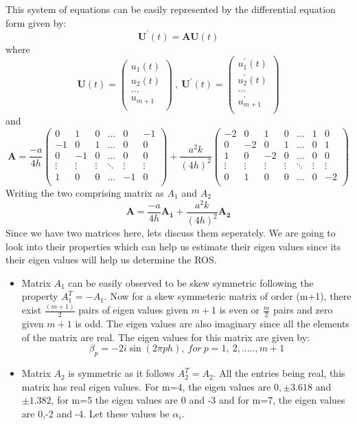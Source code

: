 \documentclass[a4paper,12pt]{report}
\begin{document}
This system of equations can be easily represented by the differential equation form given by:
$$\mathbf{U^{\prime}}(t) = \mathbf{AU}(t)$$ 
where 
\[ 
\mathbf{U}(t) = \begin{pmatrix}
u_{1}(t) \\ u_{2}(t) \\ \ldots \\ u_{m+1} \\
\end{pmatrix}
\ , \
\mathbf{U^{\prime}}(t) = \begin{pmatrix}
u^{\prime}_{1}(t) \\ u^{\prime}_{2}(t) \\ \ldots \\ u^{\prime}_{m+1} \\
\end{pmatrix}
\]
and
\[
\mathbf{A} = 
\frac{-a}{4h}
\begin{pmatrix}
0 & 1 & 0 & \ldots & 0 & -1 \\
-1& 0 & 1 & \ldots & 0 &  0 \\
0 & -1& 0 & \ldots & 0 &  0 \\
\vdots & \vdots & \vdots & \ddots & \vdots & \vdots \\ 
1 & 0 & 0 & \ldots & -1 & 0 \\
\end{pmatrix}
+\frac{a^2 k}{(4h)^2}
\begin{pmatrix}
-2& 0 & 1 & 0 & \ldots & 1 & 0 \\
0 &-2 & 0 & 1 & \ldots & 0 & 1 \\
1 & 0 &-2 & 0 & \ldots & 0 & 0 \\
\vdots & \vdots & \vdots & \vdots & \ddots & \vdots & \vdots \\
0 & 1 & 0 & 0 & \ldots & 0 & -2 \\
\end{pmatrix}
\]
Writing the two comprising matrix as $A_1$ and $A_2$
\[\mathbf{A} = \frac{-a}{4h} \mathbf{A_1} +\frac{a^2 k}{(4h)^2} \mathbf{A_2}\]
Since we have two matrices here, lets discuss them seperately. We are going to look into their properties which can help us estimate their eigen values since its their eigen values will help us determine the ROS.  \newline
\begin{itemize}
\item Matrix $A_1$ can be easily observed to be skew symmetric following the property $A_1^T = - A_1$. Now for a skew symmeteric matrix of order (m+1), there exist $\frac{(m+1)}{2}$ pairs of eigen values given $m+1$ is even or $\frac{m}{2}$ pairs and zero given $m+1$ is odd. The eigen values are also imaginary since all the elements of the matrix are real. The eigen values for this matrix are given by:
$$\beta_{p} = -2i \sin (2\pi ph),\ 	for\ p=1,\ 2,.....,m+1$$
\item Matrix $A_2$ is symmetric as it follows $A_2^T = A_2$. All the entries being real, this matrix has real eigen values. For m=4, the eigen values are $0, \pm3.618$ and $\pm1.382$, for m=5 the eigen values are 0 and -3 and for m=7, the eigen values are 0,-2 and -4. Let these values be $\alpha_i$.
\end{itemize}
\end{document}
